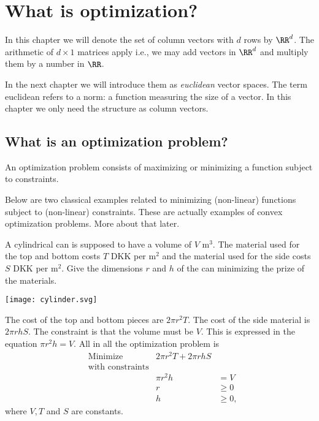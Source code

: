 \documentclass{article}
\begin{document}
\chapter{What is optimization?}


In this chapter we will denote the set of column vectors with $d$ rows by $\RR^d$.
The arithmetic
of $d\times 1$ matrices apply i.e., we may add vectors in $\RR^d$ and
multiply them by a number in $\RR$.

In the next chapter we will introduce them as \emph{euclidean} vector spaces. The
term euclidean refers to a norm: a function measuring the size of a vector. In this
chapter we only need the structure as column vectors.


\section{What is an optimization problem?}

An optimization problem consists of maximizing or minimizing a function subject
to constraints.

Below are two classical examples related to minimizing (non-linear) functions subject to
(non-linear) constraints. These are actually examples of
convex optimization problems. More about that later.

\begin{example}

  A cylindrical can is supposed to have a volume of $V$ $\text{m}^3$. The material used
  for the top and bottom costs $T$ DKK per $\text{m}^2$ and the material used for
  the side costs $S$ DKK per $\text{m}^2$. Give the dimensions $r$ and $h$ of the
  can minimizing the prize of the materials.
  
\texttt{[image: cylinder.svg]}

The cost of the top and bottom pieces are $2 \pi r^2 T$. The cost of the
side material is $2\pi r h S$. The constraint is that the volume must be
$V$. This is expressed in the equation $\pi r^2 h = V$. All in all
the optimization problem is
\begin{align*}
  &\text{Minimize} &2\pi r^2 T + 2\pi r h S&\\
  &\text{with constraints}\\
  &&\pi r^2 h &= V\\
  &&r &\geq 0\\
  &&h &\geq 0,
\end{align*}
where $V, T$ and $S$ are constants.

\end{example}
\end{document}
